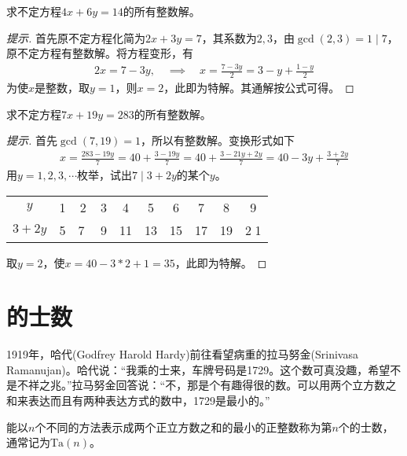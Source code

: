 \begin{example}
  求不定方程$4x+6y=14$的所有整数解。
\end{example}
\begin{proof}[提示]
  首先原不定方程化简为$2x+3y=7$，其系数为$2,3$，由$\gcd(2,3)=1\mid 7$，原不定方程有整数解。将方程变形，有
  \begin{align*}
    2x = 7-3y,\quad\implies\quad x=\frac{7-3y}{2}=3-y+\frac{1-y}{2}
  \end{align*}
  为使$x$是整数，取$y=1$，则$x=2$，此即为特解。其通解按公式可得。
\end{proof}

\begin{example}
  求不定方程$7x+19y=283$的所有整数解。
\end{example}
\begin{proof}[提示]
  首先$\gcd(7,19)=1$，所以有整数解。变换形式如下
  \begin{align*}
    x=\frac{283-19y}{7}=40+\frac{3-19y}{7}=40+\frac{3-21y+2y}{7}=40-3y+\frac{3+2y}{7}
  \end{align*}
  用$y=1,2,3,\cdots$枚举，试出$7\mid 3+2y$的某个$y$。
  \begin{center}
    \begin{tabular}{cccccccccc}
      \toprule
      $y$    & 1 & 2 & 3 & 4  & 5  & 6  & 7  & 8  & 9 \\
      $3+2y$ & 5 & \textcircled{7} & 9 & 11 & 13 & 15 & 17 & 19 & \textcircled{21}\\
      \bottomrule
    \end{tabular}
  \end{center}
  取$y=2$，使$x=40-3*2+1=35$，此即为特解。  
\end{proof}

\section{的士数}
\label{sec:taxicab-number}

1919年，哈代(Godfrey Harold Hardy)前往看望病重的拉马努金(Srinivasa Ramanujan)。哈代说：“我乘的士来，车牌号码是1729。这个数可真没趣，希望不是不祥之兆。”拉马努金回答说：“不，那是个有趣得很的数。可以用两个立方数之和来表达而且有两种表达方式的数中，1729是最小的。”

\begin{definition}
  能以$n$个不同的方法表示成两个正立方数之和的最小的正整数称为第$n$个的士数，通常记为$\mathrm{Ta}(n)$。
\end{definition}

